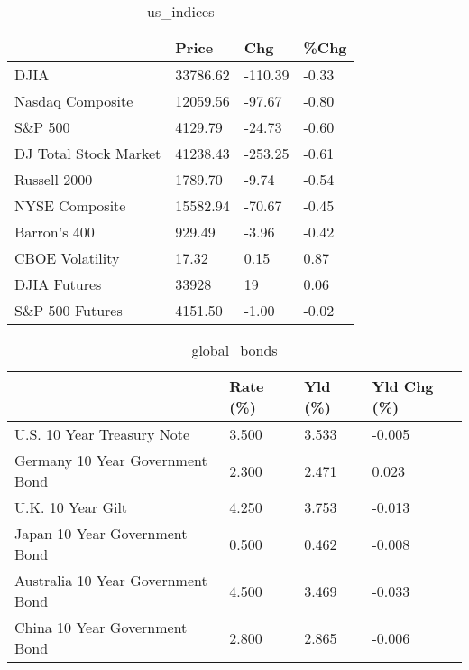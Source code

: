 \documentclass{article}%
\begin{document}
%


\begin{table}[htbp]%
\caption{us\_indices}%
\centering%
\begin{adjustbox}{width=1\textwidth}%
\begin{tabular}{llll}
\toprule
                      &    Price &     Chg &  \%Chg \\
\midrule
                 DJIA & 33786.62 & -110.39 & -0.33 \\
     Nasdaq Composite & 12059.56 &  -97.67 & -0.80 \\
              S\&P 500 &  4129.79 &  -24.73 & -0.60 \\
DJ Total Stock Market & 41238.43 & -253.25 & -0.61 \\
         Russell 2000 &  1789.70 &   -9.74 & -0.54 \\
       NYSE Composite & 15582.94 &  -70.67 & -0.45 \\
         Barron's 400 &   929.49 &   -3.96 & -0.42 \\
      CBOE Volatility &    17.32 &    0.15 &  0.87 \\
         DJIA Futures &    33928 &      19 &  0.06 \\
      S\&P 500 Futures &  4151.50 &   -1.00 & -0.02 \\
\bottomrule
\end{tabular}
%
\end{adjustbox}%
\end{table}

%


\begin{table}[htbp]%
\caption{global\_bonds}%
\centering%
\begin{adjustbox}{width=1\textwidth}%
\begin{tabular}{llll}
\toprule
                                  & Rate (\%) & Yld (\%) & Yld Chg (\%) \\
\midrule
       U.S. 10 Year Treasury Note &    3.500 &   3.533 &      -0.005 \\
  Germany 10 Year Government Bond &    2.300 &   2.471 &       0.023 \\
                U.K. 10 Year Gilt &    4.250 &   3.753 &      -0.013 \\
    Japan 10 Year Government Bond &    0.500 &   0.462 &      -0.008 \\
Australia 10 Year Government Bond &    4.500 &   3.469 &      -0.033 \\
    China 10 Year Government Bond &    2.800 &   2.865 &      -0.006 \\
\bottomrule
\end{tabular}
%
\end{adjustbox}%
\end{table}
\end{document}
